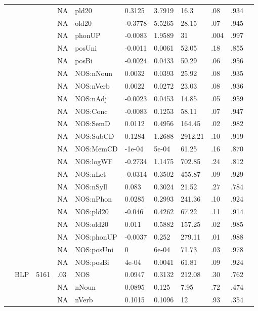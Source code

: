 \begin{table}[ht]
\begin{tabular}{lllllllllll}
   &  &  & NA & pld20 & 0.3125 & 3.7919 & 16.3 & .08 & .934 &   \\ 
   &  &  & NA & old20 & -0.3778 & 5.5265 & 28.15 & .07 & .945 &   \\ 
   &  &  & NA & phonUP & -0.0083 & 1.9589 & 31 & .004 & .997 &   \\ 
   &  &  & NA & posUni & -0.0011 & 0.0061 & 52.05 & .18 & .855 &   \\ 
   &  &  & NA & posBi & -0.0024 & 0.0433 & 50.29 & .06 & .956 &   \\ 
   &  &  & NA & NOS:nNoun & 0.0032 & 0.0393 & 25.92 & .08 & .935 &   \\ 
   &  &  & NA & NOS:nVerb & 0.0022 & 0.0272 & 23.03 & .08 & .936 &   \\ 
   &  &  & NA & NOS:nAdj & -0.0023 & 0.0453 & 14.85 & .05 & .959 &   \\ 
   &  &  & NA & NOS:Conc & -0.0083 & 0.1253 & 58.11 & .07 & .947 &   \\ 
   &  &  & NA & NOS:SemD & 0.0112 & 0.4956 & 164.45 & .02 & .982 &   \\ 
   &  &  & NA & NOS:SubCD & 0.1284 & 1.2688 & 2912.21 & .10 & .919 &   \\ 
   &  &  & NA & NOS:MemCD & -1e-04 & 5e-04 & 61.25 & .16 & .870 &   \\ 
   &  &  & NA & NOS:logWF & -0.2734 & 1.1475 & 702.85 & .24 & .812 &   \\ 
   &  &  & NA & NOS:nLet & -0.0314 & 0.3502 & 455.87 & .09 & .929 &   \\ 
   &  &  & NA & NOS:nSyll & 0.083 & 0.3024 & 21.52 & .27 & .784 &   \\ 
   &  &  & NA & NOS:nPhon & 0.0285 & 0.2993 & 241.36 & .10 & .924 &   \\ 
   &  &  & NA & NOS:pld20 & -0.046 & 0.4262 & 67.22 & .11 & .914 &   \\ 
   &  &  & NA & NOS:old20 & 0.011 & 0.5882 & 157.25 & .02 & .985 &   \\ 
   &  &  & NA & NOS:phonUP & -0.0037 & 0.252 & 279.11 & .01 & .988 &   \\ 
   &  &  & NA & NOS:posUni & 0 & 6e-04 & 71.73 & .03 & .978 &   \\ 
   &  &  & NA & NOS:posBi & 4e-04 & 0.0041 & 61.81 & .09 & .924 &   \\ 
   & BLP & 5161 & .03 & NOS & 0.0947 & 0.3132 & 212.08 & .30 & .762 &   \\ 
   &  &  & NA & nNoun & 0.0895 & 0.125 & 7.95 & .72 & .474 &   \\ 
   &  &  & NA & nVerb & 0.1015 & 0.1096 & 12 & .93 & .354 &   \\ 

\end{tabular}
\end{table}
